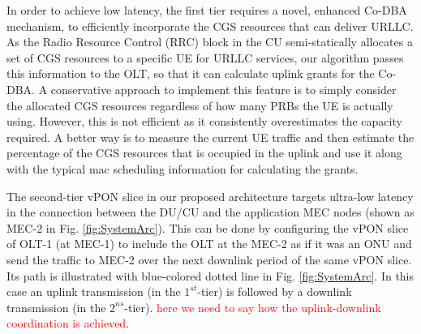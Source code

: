 \documentclass[a4paper, oneside, twocolumn, notitlepage, 10pt]{extarticle_ecoc}
\begin{document}
	In order to achieve low latency, the first tier requires a novel, enhanced Co-DBA mechanism, to efficiently incorporate the CGS resources that can deliver URLLC. As the Radio Resource Control (RRC) block in the CU semi-statically allocates a set of CGS resources to a specific UE for URLLC services, our algorithm passes this information to the OLT, so that it can calculate uplink grants for the Co-DBA. 
	A conservative approach to implement this feature is to simply consider the allocated CGS resources regardless of how many PRBs the UE is actually using. However, this is not efficient as it consistently overestimates the capacity required. A better way is to measure the current UE traffic and then estimate the percentage of the CGS resources that is occupied in the uplink and use it along with the typical mac scheduling information for calculating the grants. %
	
	The second-tier vPON slice in our proposed architecture targets ultra-low latency in the connection between the DU/CU and the application MEC nodes (shown as MEC-2 in Fig. \ref{fig:SystemArc}).   %
	This can be done by configuring the vPON slice of OLT-1 (at MEC-1) to include the OLT at the MEC-2 as if it was an ONU and send the traffic to MEC-2 over the next downlink period of the same vPON slice. Its path is illustrated with blue-colored dotted line in Fig. \ref{fig:SystemArc}. In this case an uplink transmission (in  the $1^{st}$-tier) is followed by a downlink transmission (in the $2^{ns}$-tier).  \textcolor{red}{here we need to say how the uplink-downlink coordination is achieved}. %
	
\end{document}
